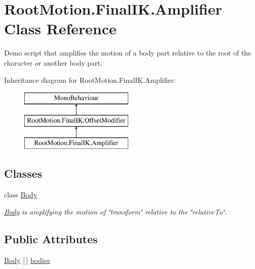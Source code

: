 \hypertarget{class_root_motion_1_1_final_i_k_1_1_amplifier}{}\section{Root\+Motion.\+Final\+I\+K.\+Amplifier Class Reference}
\label{class_root_motion_1_1_final_i_k_1_1_amplifier}


Demo script that amplifies the motion of a body part relative to the root of the character or another body part.  


Inheritance diagram for Root\+Motion.\+Final\+I\+K.\+Amplifier\+:\begin{figure}[H]
\begin{center}
\leavevmode
\includegraphics[height=3.000000cm]{class_root_motion_1_1_final_i_k_1_1_amplifier}
\end{center}
\end{figure}
\subsection*{Classes}
\begin{DoxyCompactItemize}
\item 
class \mbox{\hyperlink{class_root_motion_1_1_final_i_k_1_1_amplifier_1_1_body}{Body}}
\begin{DoxyCompactList}\small\item\em \mbox{\hyperlink{class_root_motion_1_1_final_i_k_1_1_amplifier_1_1_body}{Body}} is amplifying the motion of \char`\"{}transform\char`\"{} relative to the \char`\"{}relative\+To\char`\"{}. \end{DoxyCompactList}\end{DoxyCompactItemize}
\subsection*{Public Attributes}
\begin{DoxyCompactItemize}
\item 
\mbox{\hyperlink{class_root_motion_1_1_final_i_k_1_1_amplifier_1_1_body}{Body}} \mbox{[}$\,$\mbox{]} \mbox{\hyperlink{class_root_motion_1_1_final_i_k_1_1_amplifier_a17068ab4a0a23bb5498dbe7e0ee29d5c}{bodies}}
\end{DoxyCompactItemize}
